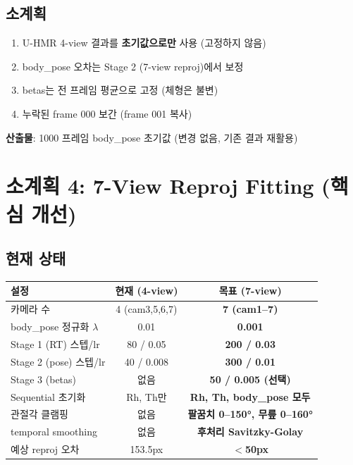 \documentclass[11pt, a4paper]{report}
\begin{document}
\subsection{소계획}
\begin{pipelinebox}[title={SP-3: U-HMR 초기값 활용 전략}]
\begin{enumerate}
\item U-HMR 4-view 결과를 \textbf{초기값으로만} 사용 (고정하지 않음)
\item body\_pose 오차는 Stage 2 (7-view reproj)에서 보정
\item betas는 전 프레임 평균으로 고정 (체형은 불변)
\item 누락된 frame 000 보간 (frame 001 복사)
\end{enumerate}
\textbf{산출물}: 1000 프레임 body\_pose 초기값 (변경 없음, 기존 결과 재활용)
\end{pipelinebox}


\section{소계획 4: 7-View Reproj Fitting (핵심 개선)}
\label{sec:sp4}

\subsection{현재 상태}
\begin{center}
\renewcommand{\arraystretch}{1.2}
\begin{tabular}{lcc}
\toprule
\textbf{설정} & \textbf{현재 (4-view)} & \textbf{목표 (7-view)} \\
\midrule
카메라 수 & 4 (cam3,5,6,7) & \textbf{7 (cam1--7)} \\
body\_pose 정규화 $\lambda$ & 0.01 & \textbf{0.001} \\
Stage 1 (RT) 스텝/lr & 80 / 0.05 & \textbf{200 / 0.03} \\
Stage 2 (pose) 스텝/lr & 40 / 0.008 & \textbf{300 / 0.01} \\
Stage 3 (betas) & 없음 & \textbf{50 / 0.005 (선택)} \\
Sequential 초기화 & Rh, Th만 & \textbf{Rh, Th, body\_pose 모두} \\
관절각 클램핑 & 없음 & \textbf{팔꿈치 0--150°, 무릎 0--160°} \\
temporal smoothing & 없음 & \textbf{후처리 Savitzky-Golay} \\
\midrule
예상 reproj 오차 & 153.5px & \textbf{$<$50px} \\
\bottomrule
\end{tabular}
\end{center}
\end{document}
